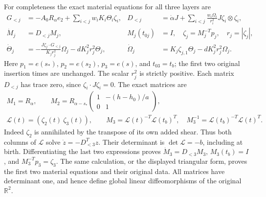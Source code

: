 For completeness the exact material equations for all three layers are
\begin{align}\label{tts:material}
 G_{<j}&=-A_0R_\alpha e_2+\sum_{i<j}w_iK_i\Theta_i\zeta_i,
 &D_{<j}&=\dot\alpha J+
   \sum_{i<j}\frac{w_i\Omega_i}{r_i^2}J\zeta_i\otimes\zeta_i,
 \nonumber\\
 \dot M_j&=D_{<j}M_j,& M_j(t_{0j})&=I,
 \quad\zeta_j=M_j^{-T}p_j,\quad r_j=|\zeta_j|,\\
 \dot\Theta_j&=-\frac{J\zeta_j\cdot G_{<j}}{K_jr_j^2}\Omega_j
                       -dK_j^2r_j^2\Theta_j,
 &\dot\Omega_j&=K_j\zeta_{j,1}\Theta_j-dK_j^2r_j^2\Omega_j.
 \nonumber
\end{align}
Here $p_1=e(s_*)$, $p_2=e(s_2)$, $p_3=e(s)$, and
$t_{03}=t_b$; the first two original insertion times are unchanged.
The scalar $r_j^2$ is strictly positive. Each matrix $D_{<j}$ has
trace zero, since $\zeta_i\cdot J\zeta_i=0$.
The exact matrices are
\begin{equation}\label{tts:matrices}
 \begin{gathered}
 M_1=R_\alpha,\qquad
 M_2=R_{\alpha-s_*}
       \begin{pmatrix}1&-(h-h_0)/a\\0&1\end{pmatrix},\\
 \mathcal L(t)=(\zeta_2(t)\ \zeta_3(t)),\qquad
 M_3=\mathcal L(t)^{-T}\mathcal L(t_b)^T,\quad
 M_3^{-1}=\mathcal L(t_b)^{-T}\mathcal L(t)^T.
 \end{gathered}
\end{equation}
Indeed $\zeta_2$ is annihilated by the transpose of its own
added shear. Thus both columns of $\mathcal L$ solve
$\dot z=-D_{<3}^Tz$. Their determinant is
$\det\mathcal L=-b$, including at birth. Differentiating the
last two expressions proves $\dot M_3=D_{<3}M_3$,
$M_3(t_b)=I$, and $M_3^{-T}p_3=\zeta_3$.
The same calculation, or the displayed triangular form, proves
the first two material equations and their original data.
All matrices have determinant one, and hence define global linear
diffeomorphisms of the original $\mathbb R^2$.

